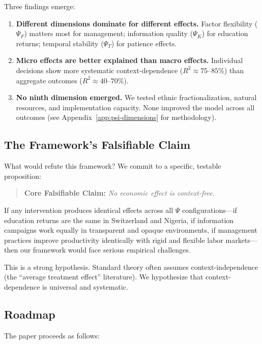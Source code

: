 \documentclass[12pt,a4paper]{article}
\begin{document}
Three findings emerge:
\begin{enumerate}
    \item \textbf{Different dimensions dominate for different effects.} Factor flexibility ($\Psi_F$) matters most for management; information quality ($\Psi_K$) for education returns; temporal stability ($\Psi_T$) for patience effects.
    
    \item \textbf{Micro effects are better explained than macro effects.} Individual decisions show more systematic context-dependence ($R^2 \approx 75$--$85\%$) than aggregate outcomes ($R^2 \approx 40$--$70\%$).
    
    \item \textbf{No ninth dimension emerged.} We tested ethnic fractionalization, natural resources, and implementation capacity. None improved the model across all outcomes (see Appendix~\ref{app:psi-dimensions} for methodology).
\end{enumerate}

\subsection{The Framework's Falsifiable Claim}

What would refute this framework? We commit to a specific, testable proposition:

\begin{quote}
\textbf{Core Falsifiable Claim:} \emph{No economic effect is context-free.}
\end{quote}

If any intervention produces identical effects across all $\Psi$ configurations---if education returns are the same in Switzerland and Nigeria, if information campaigns work equally in transparent and opaque environments, if management practices improve productivity identically with rigid and flexible labor markets---then our framework would face serious empirical challenges.

This is a strong hypothesis. Standard theory often assumes context-independence (the ``average treatment effect'' literature). We hypothesize that context-dependence is universal and systematic.

\subsection{Roadmap}

The paper proceeds as follows:
\end{document}
